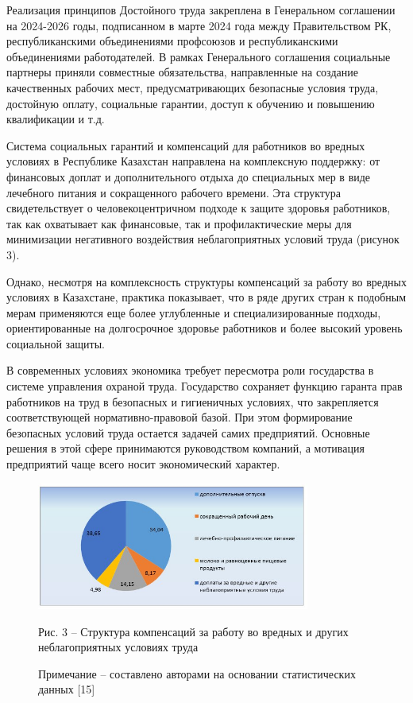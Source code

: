 \begin{multicols}{2}

Реализация принципов Достойного труда закреплена в Генеральном
соглашении на 2024-2026 годы, подписанном в марте 2024 года между
Правительством РК, республиканскими объединениями профсоюзов и
республиканскими объединениями работодателей. В рамках Генерального
соглашения социальные партнеры приняли совместные обязательства,
направленные на создание качественных рабочих мест, предусматривающих
безопасные условия труда, достойную оплату, социальные гарантии, доступ
к обучению и повышению квалификации и т.д.

Система социальных гарантий и компенсаций для работников во вредных
условиях в Республике Казахстан направлена на комплексную поддержку: от
финансовых доплат и дополнительного отдыха до специальных мер в виде
лечебного питания и сокращенного рабочего времени. Эта структура
свидетельствует о человекоцентричном подходе к защите здоровья
работников, так как охватывает как финансовые, так и профилактические
меры для минимизации негативного воздействия неблагоприятных условий
труда (рисунок 3).

Однако, несмотря на комплексность структуры компенсаций за работу во
вредных условиях в Казахстане, практика показывает, что в ряде других
стран к подобным мерам применяются еще более углубленные и
специализированные подходы, ориентированные на долгосрочное здоровье
работников и более высокий уровень социальной защиты.

В современных условиях экономика требует пересмотра роли государства в
системе управления охраной труда. Государство сохраняет функцию гаранта
прав работников на труд в безопасных и гигиеничных условиях, что
закрепляется соответствующей нормативно-правовой базой. При этом
формирование безопасных условий труда остается задачей самих
предприятий. Основные решения в этой сфере принимаются руководством
компаний, а мотивация предприятий чаще всего носит экономический
характер.

\end{multicols}


\begin{figure}[H]
	\centering
	\includegraphics[width=0.8\textwidth]{media/ekon/image5.3}
	\caption*{Рис. 3 -- Структура компенсаций за работу во вредных и других
  неблагоприятных условиях труда}
  \caption*{Примечание -- составлено авторами на основании статистических
  данных {[}15{]}}
\end{figure}

